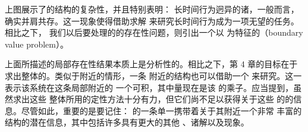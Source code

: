 上图展示了\trHamiltonianSystem{}的\trOrbit{}结构的复杂性，并且特别表明：%
长时间行为迥异的诸\trOrbit，一般而言，确实并肩共存。这一现象使得借助求解%
\trCauchy{}\trInitialValueProblem{}来研究长时间行为成为一项无望的任务。相比之下，%
我们以后要处理的\trPeriodicSolution{}的存在性问题，则引出一个以%
\trVariationalPrinciple{}为特征的\textbf{\trBoundaryValueProblem}（boundary value problem）。

上面所描述的局部存在性结果本质上是分析性的。相比之下，第 4 章的目标在于%
求出整体的\trPeriodicSolution。类似于\trEquilibrium{}附近的情形，一条%
\trPeriodicSolution{}附近的\trOrbit{}结构也可以借助一个\trBirkhoff\trNormalForm{}%
来研究。这一\trNormalForm{}表示该系统在这条\trPeriodicSolution{}局部附近的%
一个可积\trApproximation，其中\trLinear{}\trInvariant{}量现在是该%
\trPeriodicOrbit{}的\trFloquet{}乘子。应当提到，虽然求出这些%
整体\trPeriodicSolution{}所用的定性方法十分有力，但它们尚不足以获得关于这些%
\trPeriodicSolution{}的\trBirkhoffInvariant{}的信息。尽管如此，重要的是要记住：%
\trHamiltonianSystem{}的一条单一\trPeriodicOrbit{}携带着关于其附近一个非常%
丰富的\trOrbit{}结构的潜在信息，其中包括许多具有更大\trPeriodic{}的其他%
\trPeriodicOrbit、诸\trQuasiPeriodic{}解以及\trHyperbolic{}现象。
